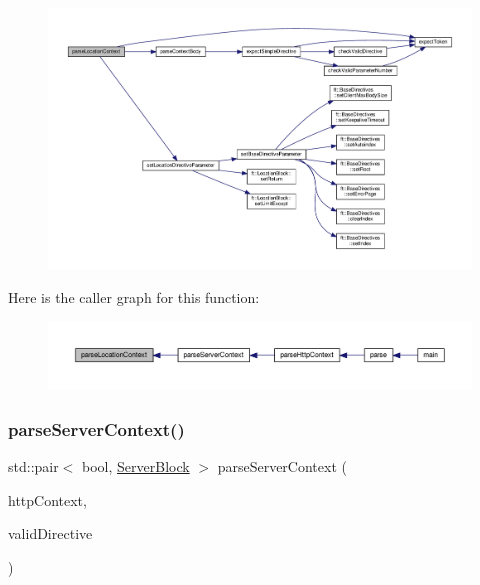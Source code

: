 \begin{figure}[H]
\begin{center}
\leavevmode
\includegraphics[width=350pt]{classft_1_1_parser_a4eb83702cdd8772017f71dda995c4089_cgraph}
\end{center}
\end{figure}
Here is the caller graph for this function\+:
\nopagebreak
\begin{figure}[H]
\begin{center}
\leavevmode
\includegraphics[width=350pt]{classft_1_1_parser_a4eb83702cdd8772017f71dda995c4089_icgraph}
\end{center}
\end{figure}
\mbox{\label{classft_1_1_parser_ae53bb700e0344f7af2519a5af3ae4230}} 
\subsubsection{\texorpdfstring{parse\+Server\+Context()}{parseServerContext()}}
{\footnotesize\ttfamily std\+::pair$<$ bool, \hyperlink{classft_1_1_server_block}{Server\+Block} $>$ parse\+Server\+Context (\begin{DoxyParamCaption}\item[{\hyperlink{classft_1_1_http_block}{Http\+Block} \&}]{http\+Context,  }\item[{std\+::pair$<$ bool, \hyperlink{classft_1_1_directive}{Directive} $>$}]{valid\+Directive }\end{DoxyParamCaption})}



